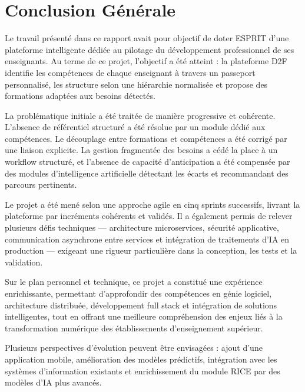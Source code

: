 \documentclass[12pt,a4paper]{report}
\begin{document}
\clearpage
\chapter*{Conclusion Générale}
\thispagestyle{plain}

Le travail présenté dans ce rapport avait pour objectif de doter ESPRIT
d'une plateforme intelligente dédiée au pilotage du développement
professionnel de ses enseignants. Au terme de ce projet, l'objectif a été
atteint : la plateforme D2F identifie les compétences de chaque enseignant
à travers un passeport personnalisé, les structure selon une hiérarchie
normalisée et propose des formations adaptées aux besoins détectés.

La problématique initiale a été traitée de manière progressive et
cohérente. L'absence de référentiel structuré a été résolue par un module
dédié aux compétences. Le découplage entre formations et compétences a été
corrigé par une liaison explicite. La gestion fragmentée des besoins a
cédé la place à un workflow structuré, et l'absence de capacité
d'anticipation a été compensée par des modules d'intelligence artificielle
détectant les écarts et recommandant des parcours pertinents.

Le projet a été mené selon une approche agile en cinq sprints successifs,
livrant la plateforme par incréments cohérents et validés. Il a également
permis de relever plusieurs défis techniques --- architecture
microservices, sécurité applicative, communication asynchrone entre
services et intégration de traitements d'IA en production --- exigeant une
rigueur particulière dans la conception, les tests et la validation.

Sur le plan personnel et technique, ce projet a constitué une expérience
enrichissante, permettant d'approfondir des compétences en génie logiciel,
architecture distribuée, développement full stack et intégration de
solutions intelligentes, tout en offrant une meilleure compréhension des
enjeux liés à la transformation numérique des établissements
d'enseignement supérieur.

Plusieurs perspectives d'évolution peuvent être envisagées : ajout d'une
application mobile, amélioration des modèles prédictifs, intégration avec
les systèmes d'information existants et enrichissement du module RICE par
des modèles d'IA plus avancés.

\setlength{\bibitemsep}{2pt plus 1pt minus 1pt}
\setlength{\bibparsep}{0pt}
\setlength{\bibhang}{2em}
\printbibliography[title={Bibliographie et Nétographie}, heading=bibintoc]
\end{document}
